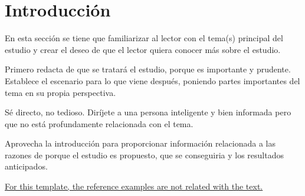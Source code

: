 \chapter*{Introducción}
\thispagestyle{empty} %
\label{cha:0_intro}

En esta sección se tiene que familiarizar al lector con el tema(s) principal del estudio y crear el deseo de que el lector quiera conocer más sobre el estudio.~\cite{Gumiaux2003}

Primero redacta de que se tratará el estudio, porque es importante y prudente. Establece el escenario para lo que viene después, poniendo partes importantes del tema en su propia perspectiva.~\cite{Diggle2007}

Sé directo, no tedioso. Diríjete a una persona inteligente y bien informada pero que no está profundamente relacionada con el tema.~\cite{Diggle2007}

Aprovecha la introducción para proporcionar información relacionada a las razones de porque el estudio es propuesto, que se conseguiria y los resultados anticipados.~\cite{Sun2012,Gumiaux2003}

\underline{For this template, the reference examples are not related with the text.}
